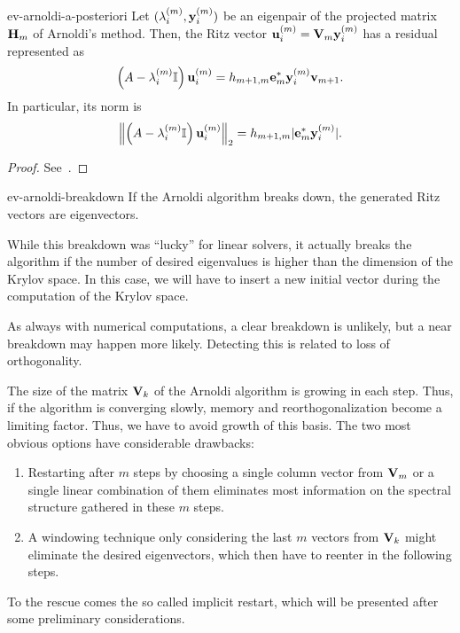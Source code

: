 \begin{Lemma}{ev-arnoldi-a-posteriori}
  Let $(\lambda_i^{(m)},\vy_i^{(m)})$ be an eigenpair of the projected
  matrix $\matH_m$ of Arnoldi's method. Then, the Ritz vector
  $\vu_i^{(m)} = \matv_m \vy_i^{(m)}$ has a residual represented as
  \begin{gather}
    \left(A-\lambda_i^{(m)}\identity\right)\vu_i^{(m)}
    = h_{m+1,m}\ve_m^*\vy_i^{(m)}\vv_{m+1}.
  \end{gather}
  In particular, its norm is
  \begin{gather}
    \norm*{\left(A-\lambda_i^{(m)}\identity\right)\vu_i^{(m)}}_2
    = h_{m+1,m} \abs{\ve_m^*\vy_i^{(m)}}.
  \end{gather}
\end{Lemma}

\begin{proof}
  See~\cite[Proposition 6.8]{Saad11}.
\end{proof}

\begin{Corollary}{ev-arnoldi-breakdown}
  If the Arnoldi algorithm breaks down, the generated Ritz vectors are
  eigenvectors.
\end{Corollary}

\begin{remark}
  While this breakdown was ``lucky'' for linear solvers, it actually
  breaks the algorithm if the number of desired eigenvalues is higher
  than the dimension of the Krylov space. In this case, we will have
  to insert a new initial vector during the computation of the Krylov
  space.

  As always with numerical computations, a clear breakdown is
  unlikely, but a near breakdown may happen more likely. Detecting
  this is related to loss of orthogonality.
\end{remark}

\begin{intro}
  The size of the matrix $\matv_k$ of the Arnoldi algorithm is growing
  in each step. Thus, if the algorithm is converging slowly, memory
  and reorthogonalization become a limiting factor. Thus, we have to
  avoid growth of this basis. The two most obvious options have
  considerable drawbacks:
  \begin{enumerate}
  \item Restarting after $m$ steps by choosing a single column vector
    from $\matv_m$ or a single linear combination of them eliminates
    most information on the spectral structure gathered in these $m$
    steps.
  \item A windowing technique only considering the last $m$ vectors
    from $\matv_k$ might eliminate the desired eigenvectors, which
    then have to reenter in the following steps.
  \end{enumerate}
  To the rescue comes the so called implicit restart, which will be
  presented after some preliminary considerations.
\end{intro}

